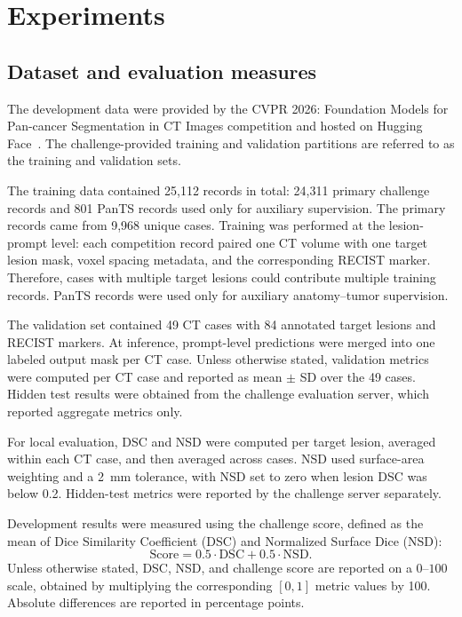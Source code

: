 \section{Experiments}

\subsection{Dataset and evaluation measures}
\label{sec:dataset_evaluation}

The development data were provided by the CVPR 2026: Foundation Models for Pan-cancer Segmentation in CT Images competition and hosted on Hugging Face~\cite{FLAREMedFMFLARETask1PancancerRECISTto3DDatasets}. The challenge-provided training and validation partitions are referred to as the training and validation sets.

The training data contained 25,112 records in total: 24,311 primary challenge records and 801 PanTS records used only for auxiliary supervision. The primary records came from 9,968 unique cases. Training was performed at the lesion-prompt level: each competition record paired one CT volume with one target lesion mask, voxel spacing metadata, and the corresponding RECIST marker. Therefore, cases with multiple target lesions could contribute multiple training records. PanTS records were used only for auxiliary anatomy--tumor supervision.

The validation set contained 49 CT cases with 84 annotated target lesions and RECIST markers. At inference, prompt-level predictions were merged into one labeled output mask per CT case. Unless otherwise stated, validation metrics were computed per CT case and reported as mean \(\pm\) SD over the 49 cases. Hidden test results were obtained from the challenge evaluation server, which reported aggregate metrics only.

For local evaluation, DSC and NSD were computed per target lesion, averaged within each CT case, and then averaged across cases. NSD used surface-area weighting and a 2~mm tolerance, with NSD set to zero when lesion DSC was below 0.2. Hidden-test metrics were reported by the challenge server separately.

Development results were measured using the challenge score, defined as the mean of Dice Similarity Coefficient (DSC) and Normalized Surface Dice (NSD):
\begin{equation}
\label{eq:score}
    \mathrm{Score}
    =
    0.5 \cdot \mathrm{DSC}
    +
    0.5 \cdot \mathrm{NSD}.
\end{equation}
Unless otherwise stated, DSC, NSD, and challenge score are reported on a \(0\)--\(100\) scale, obtained by multiplying the corresponding \([0,1]\) metric values by 100. Absolute differences are reported in percentage points.

